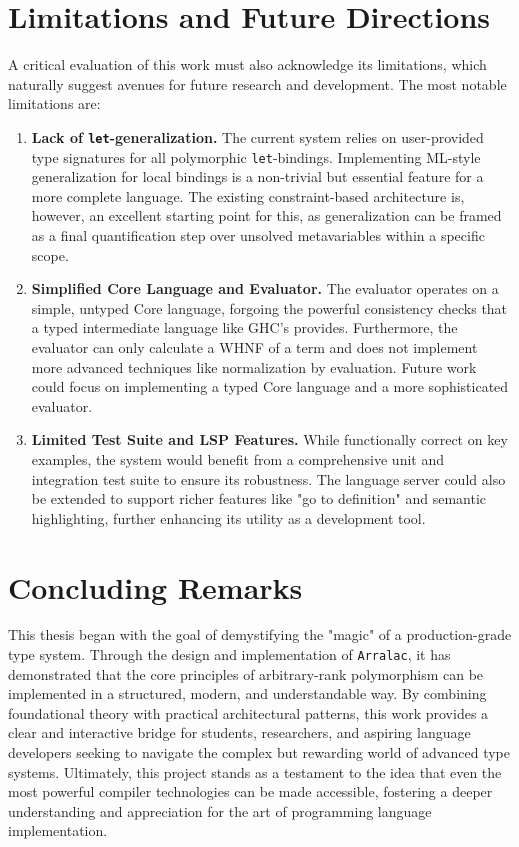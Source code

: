 \section{Limitations and Future Directions}
A critical evaluation of this work must also acknowledge its limitations, which naturally suggest avenues for future research and development. The most notable limitations are:
\begin{enumerate}
    \item \textbf{Lack of \texttt{let}-generalization.} The current system relies on user-provided type signatures for all polymorphic \texttt{let}-bindings. Implementing ML-style generalization for local bindings is a non-trivial but essential feature for a more complete language. The existing constraint-based architecture is, however, an excellent starting point for this, as generalization can be framed as a final quantification step over unsolved metavariables within a specific scope.
    \item \textbf{Simplified Core Language and Evaluator.} The evaluator operates on a simple, untyped Core language, forgoing the powerful consistency checks that a typed intermediate language like GHC's provides. Furthermore, the evaluator can only calculate a WHNF of a term and does not implement more advanced techniques like normalization by evaluation. Future work could focus on implementing a typed Core language and a more sophisticated evaluator.
    \item \textbf{Limited Test Suite and LSP Features.} While functionally correct on key examples, the system would benefit from a comprehensive unit and integration test suite to ensure its robustness. The language server could also be extended to support richer features like "go to definition" and semantic highlighting, further enhancing its utility as a development tool.
\end{enumerate}

\section{Concluding Remarks}
This thesis began with the goal of demystifying the "magic" of a production-grade type system. Through the design and implementation of \texttt{Arralac}, it has demonstrated that the core principles of arbitrary-rank polymorphism can be implemented in a structured, modern, and understandable way. By combining foundational theory with practical architectural patterns, this work provides a clear and interactive bridge for students, researchers, and aspiring language developers seeking to navigate the complex but rewarding world of advanced type systems. Ultimately, this project stands as a testament to the idea that even the most powerful compiler technologies can be made accessible, fostering a deeper understanding and appreciation for the art of programming language implementation.